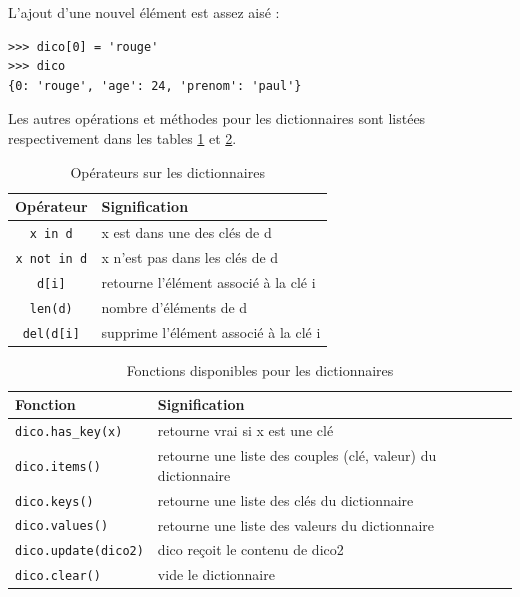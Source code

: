 \documentclass[12pt, a4paper]{article}
\begin{document}
L'ajout d'une nouvel élément est assez aisé :
\begin{lstlisting}
>>> dico[0] = 'rouge'
>>> dico
{0: 'rouge', 'age': 24, 'prenom': 'paul'}
\end{lstlisting}

Les autres opérations et méthodes pour les dictionnaires sont listées respectivement dans les tables \ref{tab:operateurs_dictionnaires} et \ref{tab:fonctions_dictionnaires}.

\begin{table}[H]
	\begin{center}
		\begin{tabular}{|c|l|}
			\hline
			\textbf{Opérateur} & \textbf{Signification} \\
			\hline
			\lstinline{x in d} & x est dans une des clés de d \\
			\lstinline{x not in d} & x n'est pas dans les clés de d \\
			\lstinline{d[i]} & retourne l'élément associé à la clé i \\
			\lstinline{len(d)}  & nombre d'éléments de d \\
			\lstinline{del(d[i]}  & supprime l'élément associé à la clé i \\
			\hline
		\end{tabular}
		\caption{Opérateurs sur les dictionnaires}
		\label{tab:operateurs_dictionnaires}
	\end{center}
\end{table}

\begin{table}[H]
	\begin{center}
		\begin{tabular}{|l|l|}
			\hline
			\textbf{Fonction} & \textbf{Signification} \\
			\hline
			\lstinline{dico.has_key(x)} & retourne vrai si x est une clé \\
			\lstinline{dico.items()} & retourne une liste des couples (clé, valeur) du dictionnaire \\
			\lstinline{dico.keys()} & retourne une liste des clés du dictionnaire \\
			\lstinline{dico.values()}  & retourne une liste des valeurs du dictionnaire \\
			\lstinline{dico.update(dico2)}  & dico reçoit le contenu de dico2 \\
			\lstinline{dico.clear()}  & vide le dictionnaire \\
			\hline
		\end{tabular}
		\caption{Fonctions disponibles pour les dictionnaires}
		\label{tab:fonctions_dictionnaires}
	\end{center}
\end{table}
\end{document}
